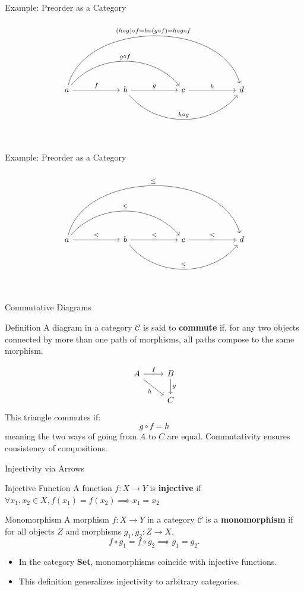 \documentclass[aspectratio=169]{beamer}
\begin{document}
\begin{frame}[fragile]{Example: Preorder as a Category}
  \[
    \begin{tikzcd}[row sep=2cm, column sep=2cm]
      a \arrow[r, "f"] \arrow[rr, bend left=50, "g \circ f"] \arrow[rrr, bend left=75, "(h \circ g) \circ f = h \circ (g \circ f) = h \circ g \circ f "] & b \arrow[r, "g"] \arrow[rr, bend right=50, "h \circ g"] & c \arrow[r, "h"] & d \\
    \end{tikzcd}
  \]
\end{frame}

\begin{frame}[fragile]{Example: Preorder as a Category}
  \[
    \begin{tikzcd}[row sep=2cm, column sep=2cm]
      a \arrow[r, "\leq"] \arrow[rr, bend left=50, "\leq"] \arrow[rrr, bend left=75, "\leq"] & b \arrow[r, "\leq"] \arrow[rr, bend right=50, "\leq"] & c \arrow[r, "\leq"] & d \\
    \end{tikzcd}
  \]
\end{frame}

\begin{frame}[fragile]{Commutative Diagrams}
  \begin{block}{Definition}
    A diagram in a category \(\mathcal{C}\) is said to \textbf{commute} if, for any two objects connected by more than one path of morphisms, all paths compose to the same morphism.
  \end{block}
  \[
    \begin{tikzcd}
      A \arrow[r, "f"] \arrow[rd, "h"'] & B \arrow[d, "g"] \\
      & C
    \end{tikzcd}
  \]
  This triangle commutes if:
  \[
    g \circ f = h
  \]
  meaning the two ways of going from \(A\) to \(C\) are equal. Commutativity ensures consistency of compositions.
\end{frame}

\begin{frame}[fragile]{Injectivity via Arrows}
  \begin{block}{Injective Function}
    A function $f : X \to Y$ is \textbf{injective} if
    \(
    \forall x_1, x_2 \in X, f(x_1) = f(x_2) \implies x_1 = x_2
    \)
  \end{block}
  \begin{block}{Monomorphism}
    A morphism $f : X \to Y$ in a category $\mathcal{C}$ is a \textbf{monomorphism} if for all objects $Z$ and morphisms $g_1, g_2 : Z \to X$,
    \[
      f \circ g_1 = f \circ g_2 \implies g_1 = g_2.
    \]
    \begin{itemize}
    \item In the category \textbf{Set}, monomorphisms coincide with injective functions.
    \item This definition generalizes injectivity to arbitrary categories.
    \end{itemize}
  \end{block}
\end{frame}
\end{document}
